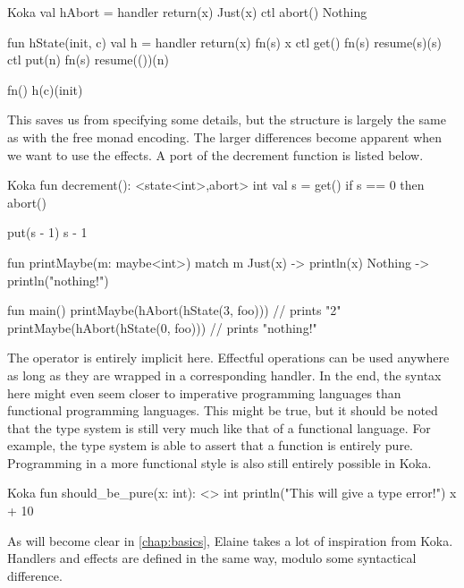 \begin{lst}{Koka}
val hAbort = handler
  return(x)   Just(x)
  ctl abort() Nothing

fun hState(init, c)
  val h = handler
    return(x)  fn(s) x
    ctl get()  fn(s) resume(s)(s)
    ctl put(n) fn(s) resume(())(n)

  fn() h(c)(init)
\end{lst}

This saves us from specifying some details, but the structure is largely the same as with the free monad encoding. The larger differences become apparent when we want to use the effects. A port of the decrement function is listed below.

\begin{lst}{Koka}
fun decrement(): <state<int>,abort> int
  val s = get()
  if s == 0 then
    abort()
  
  put(s - 1)
  s - 1 

fun printMaybe(m: maybe<int>)
  match m
    Just(x) -> println(x)
    Nothing -> println("nothing!")

fun main()
  printMaybe(hAbort(hState(3, foo))) // prints "2"
  printMaybe(hAbort(hState(0, foo))) // prints "nothing!"
\end{lst}

The \hs{>>=} operator is entirely implicit here. Effectful operations can be used anywhere as long as they are wrapped in a corresponding handler. In the end, the syntax here might even seem closer to imperative programming languages than functional programming languages. This might be true, but it should be noted that the type system is still very much like that of a functional language. For example, the type system is able to assert that a function is entirely pure. Programming in a more functional style is also still entirely possible in Koka.

\begin{lst}{Koka}
fun should_be_pure(x: int): <> int
  println("This will give a type error!")
  x + 10
\end{lst}

As will become clear in \cref{chap:basics}, Elaine takes a lot of inspiration from Koka. Handlers and effects are defined in the same way, modulo some syntactical difference.
